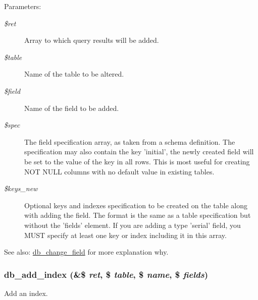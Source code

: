 \begin{Desc}
\item[Parameters:]
\begin{description}
\item[{\em \$ret}]Array to which query results will be added. \item[{\em \$table}]Name of the table to be altered. \item[{\em \$field}]Name of the field to be added. \item[{\em \$spec}]The field specification array, as taken from a schema definition. The specification may also contain the key 'initial', the newly created field will be set to the value of the key in all rows. This is most useful for creating NOT NULL columns with no default value in existing tables. \item[{\em \$keys\_\-new}]Optional keys and indexes specification to be created on the table along with adding the field. The format is the same as a table specification but without the 'fields' element. If you are adding a type 'serial' field, you MUST specify at least one key or index including it in this array. \end{description}
\end{Desc}
\begin{Desc}
\item[See also:]\hyperlink{group__schemaapi_g03f152245358d2db68d067aa8a1fceb4}{db\_\-change\_\-field} for more explanation why. \end{Desc}
\hypertarget{group__schemaapi_gaaa3b734b6b1acc09fb5e2ac8bd7d925}{
\subsubsection[{db\_\-add\_\-index}]{\setlength{\rightskip}{0pt plus 5cm}db\_\-add\_\-index (\&\$ {\em ret}, \/  \$ {\em table}, \/  \$ {\em name}, \/  \$ {\em fields})}}
\label{group__schemaapi_gaaa3b734b6b1acc09fb5e2ac8bd7d925}


Add an index.

